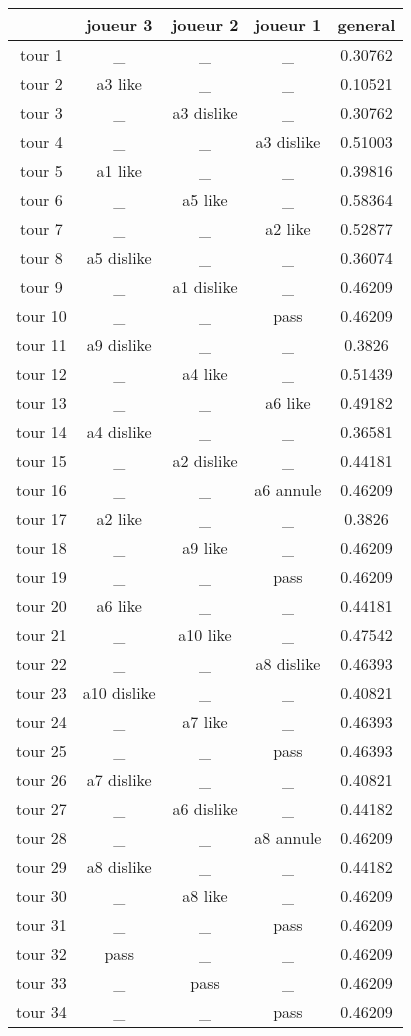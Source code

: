 \documentclass{article}
\begin{document}
\begin{tabular}{|c|c|c|c|c|}
\hline
& joueur 3 & joueur 2 & joueur 1 & general \\
\hline
tour 1 & \_ & \_ & \_ & 0.30762 \\
\hline
tour 2 & a3 like & \_ & \_ & 0.10521 \\
\hline
tour 3 & \_ & a3 dislike & \_ & 0.30762 \\
\hline
tour 4 & \_ & \_ & a3 dislike & 0.51003 \\
\hline
tour 5 & a1 like & \_ & \_ & 0.39816 \\
\hline
tour 6 & \_ & a5 like & \_ & 0.58364 \\
\hline
tour 7 & \_ & \_ & a2 like & 0.52877 \\
\hline
tour 8 & a5 dislike & \_ & \_ & 0.36074 \\
\hline
tour 9 & \_ & a1 dislike & \_ & 0.46209 \\
\hline
tour 10 & \_ & \_ & pass & 0.46209 \\
\hline
tour 11 & a9 dislike & \_ & \_ & 0.3826 \\
\hline
tour 12 & \_ & a4 like & \_ & 0.51439 \\
\hline
tour 13 & \_ & \_ & a6 like & 0.49182 \\
\hline
tour 14 & a4 dislike & \_ & \_ & 0.36581 \\
\hline
tour 15 & \_ & a2 dislike & \_ & 0.44181 \\
\hline
tour 16 & \_ & \_ & a6 annule & 0.46209 \\
\hline
tour 17 & a2 like & \_ & \_ & 0.3826 \\
\hline
tour 18 & \_ & a9 like & \_ & 0.46209 \\
\hline
tour 19 & \_ & \_ & pass & 0.46209 \\
\hline
tour 20 & a6 like & \_ & \_ & 0.44181 \\
\hline
tour 21 & \_ & a10 like & \_ & 0.47542 \\
\hline
tour 22 & \_ & \_ & a8 dislike & 0.46393 \\
\hline
tour 23 & a10 dislike & \_ & \_ & 0.40821 \\
\hline
tour 24 & \_ & a7 like & \_ & 0.46393 \\
\hline
tour 25 & \_ & \_ & pass & 0.46393 \\
\hline
tour 26 & a7 dislike & \_ & \_ & 0.40821 \\
\hline
tour 27 & \_ & a6 dislike & \_ & 0.44182 \\
\hline
tour 28 & \_ & \_ & a8 annule & 0.46209 \\
\hline
tour 29 & a8 dislike & \_ & \_ & 0.44182 \\
\hline
tour 30 & \_ & a8 like & \_ & 0.46209 \\
\hline
tour 31 & \_ & \_ & pass & 0.46209 \\
\hline
tour 32 & pass & \_ & \_ & 0.46209 \\
\hline
tour 33 & \_ & pass & \_ & 0.46209 \\
\hline
tour 34 & \_ & \_ & pass & 0.46209 \\
\hline
\end{tabular}
\end{document}
